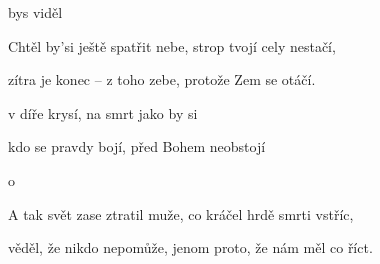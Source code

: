 

\zs
{}  

 

  

 bys  viděl  
\ks

\zs
Chtěl by'si ještě spatřit nebe, strop tvojí cely nestačí,

zítra je konec -- z toho zebe, protože Zem se otáčí.
\ks

\zr
{}   

 v díře krysí,  na smrt jako by si 

 kdo se pravdy bojí,  před Bohem neobstojí 

o  
\kr

\zs
A tak svět zase ztratil muže, co kráčel hrdě smrti vstříc,

věděl, že nikdo nepomůže, jenom proto, že nám měl co říct.
\ks

\zr\kr

\kp
